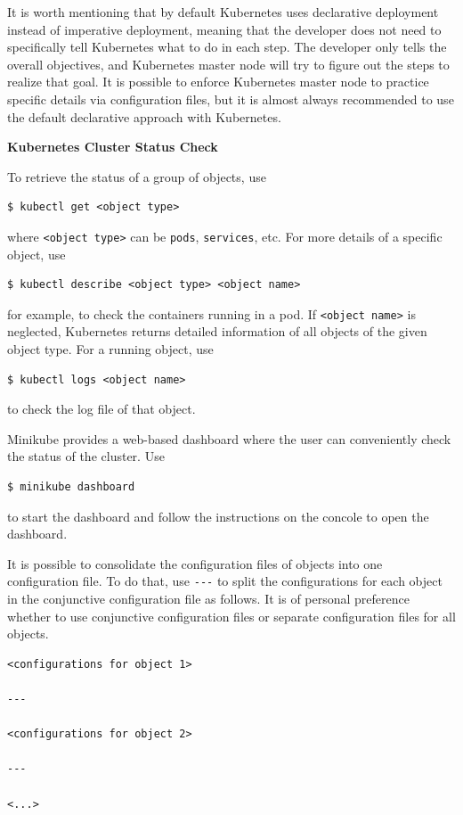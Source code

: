 It is worth mentioning that by default Kubernetes uses declarative deployment instead of imperative deployment, meaning that the developer does not need to specifically tell Kubernetes what to do in each step. The developer only tells the overall objectives, and Kubernetes master node will try to figure out the steps to realize that goal. It is possible to enforce Kubernetes master node to practice specific details via configuration files, but it is almost always recommended to use the default declarative approach with Kubernetes.

\vspace{0.1in}
\noindent \textbf{Kubernetes Cluster Status Check}
\vspace{0.1in}

To retrieve the status of a group of objects, use
\begin{lstlisting}
$ kubectl get <object type>
\end{lstlisting}
where \verb|<object type>| can be \verb|pods|, \verb|services|, etc. For more details of a specific object, use
\begin{lstlisting}
$ kubectl describe <object type> <object name>
\end{lstlisting}
for example, to check the containers running in a pod. If \verb|<object name>| is neglected, Kubernetes returns detailed information of all objects of the given object type. For a running object, use
\begin{lstlisting}
$ kubectl logs <object name>
\end{lstlisting}
to check the log file of that object.

Minikube provides a web-based dashboard where the user can conveniently check the status of the cluster. Use
\begin{lstlisting}
$ minikube dashboard
\end{lstlisting} 
to start the dashboard and follow the instructions on the concole to open the dashboard.

It is possible to consolidate the configuration files of objects into one configuration file. To do that, use \verb|---| to split the configurations for each object in the conjunctive configuration file as follows. It is of personal preference whether to use conjunctive configuration files or separate configuration files for all objects.
\begin{lstlisting}
<configurations for object 1>

---

<configurations for object 2>

---

<...>
\end{lstlisting}

